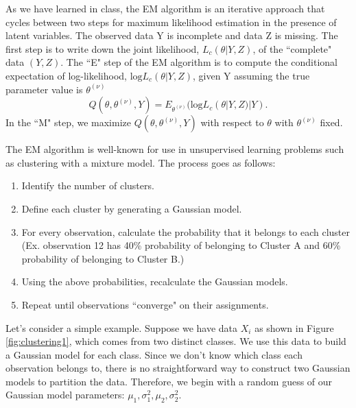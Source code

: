 \documentclass[11pt]{article}
\begin{document}
As we have learned in class, the EM algorithm is an iterative approach that cycles between two steps for maximum likelihood estimation in the presence of latent variables. The observed data Y is incomplete and data Z is missing. The first step is to write down the joint likelihood, $L_c(
\theta|Y,Z)$, of the ``complete" data $(Y,Z)$. The ``E" step of the EM algorithm is to compute the conditional expectation of log-likelihood, $\text{log}L_c(
\theta|Y,Z)$, given Y assuming the true parameter value is $\theta^{(\nu)}$
\[Q(\theta,\theta^{(\nu)},Y)=E_{\theta^{(\nu)}}(\text{log}L_c(
\theta|Y,Z)|Y).\] In the ``M" step, we maximize $Q(\theta,\theta^{(\nu)},Y)$ with respect to $\theta$ with $\theta^{(\nu)}$ fixed. 

The EM algorithm is well-known for use in unsupervised learning problems such as clustering with a mixture model. The process goes as follows:
\begin{enumerate}
    \item Identify the number of clusters. 
    \item Define each cluster by generating a Gaussian model. 
    \item For every observation, calculate the probability that it belongs to each cluster (Ex. observation 12 has 40\% probability of belonging to Cluster A and 60\% probability of belonging to Cluster B.)
    \item Using the above probabilities, recalculate the Gaussian models. 
    \item Repeat until observations ``converge" on their assignments. 
\end{enumerate}

Let's consider a simple example. Suppose we have data $X_i$ as shown in Figure \ref{fig:clustering1}, which comes from two distinct classes. We use this data to build a Gaussian model for each class. Since we don't know which class each observation belongs to, there is no straightforward way to construct two Gaussian models to partition the data. Therefore, we begin with a random guess of our Gaussian model parameters: $\mu_1,\sigma^2_1, \mu_2,\sigma^2_2$. 
\end{document}
